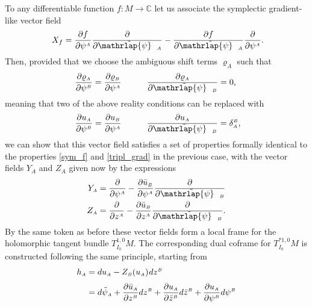 \documentclass[11pt]{amsart}
\theoremstyle{remark}
\theoremstyle{remark}
\theoremstyle{definition}
\theoremstyle{definition}
\theoremstyle{definition}
\newcommand{\0}{{\scriptstyle 0'}} %
\newcommand{\1}{{\scriptstyle 1'}}
\newcommand{\A}{{\scriptscriptstyle A}} %
\newcommand{\B}{{\scriptscriptstyle B}}
\newcommand{\C}{{\scriptscriptstyle C}}
\newcommand{\hp}{\hspace{0.5pt}} %
\newcommand{\psitilde}{\raisebox{0.3pt}{\smash{$\tilde{\smash{\mathrlap{\psi}} \vphantom{\rule[6.5pt]{0pt}{0pt}} \hphantom{\hspace{10.5pt}}}$}} \hspace{-4.1pt}}
\begin{document}
To any differentiable function $f : M \rightarrow \mathbb{C}$ let us associate the symplectic gradient-like vector field 
\begin{equation} \label{X_f_2}
X_f = \frac{\partial f}{\partial \psi^{\A}} \frac{\partial}{\partial \psitilde_{\A}} - \frac{\partial f}{\partial \psitilde_{\A}} \frac{\partial}{\partial \psi^{\A}} \rlap{.}
\end{equation}
Then, provided that we choose the ambiguous shift terms $\varrho_{\A}$ such that
\begin{equation} \label{shift-constr}
\!\!\! \frac{\partial \varrho_{\A}}{\partial \psi^{\B}} = \frac{\partial \varrho_{\B}}{\partial \psi^{\A}}
\qquad\quad
\frac{\partial \varrho_{\A}}{\partial \psitilde_{\B}} = 0  \rlap{,}
\end{equation}
meaning that two of the above reality conditions can be replaced with
\begin{equation}
\frac{\partial u_{\A}}{\partial \psi^{\B}} = \frac{\partial u_{\B}}{\partial \psi^{\A}} 
\qquad\quad
\frac{\partial u_{\A}}{\partial \psitilde_{\B}} = \delta^{\B}_{\A} \rlap{,}
\end{equation}
we can show that this vector field satisfies a set of properties formally identical to the properties \eqref{sym_f} and \eqref{tripl_grad} in the previous case, with the vector fields $Y_{\A}$ and $Z_{\A}$ given now by the expressions
\begin{equation} \label{YZ_2}
\begin{aligned}
Y_{\A} & = \frac{\partial }{\partial \psi^{\A}} - \frac{\partial \bar{u}_{\B}}{\partial \psi^{\A}} \frac{\partial}{\partial \psitilde_{\B}} \\
Z_{\A} & = \frac{\partial }{\partial z^{\A}} - \frac{\partial \bar{u}_{\B}}{\partial z^{\A}} \frac{\partial}{\partial \psitilde_{\B}}  \rlap{.}
\end{aligned}
\end{equation}
By the same token as before these vector fields form a local frame for  the holomorphic tangent bundle $T^{1,0}_{I_0}M$. The corresponding dual coframe for $T^{*1,0}_{I_0}M$ is constructed following the same principle, starting from
{\allowdisplaybreaks
\begin{align} \label{h_A_2}
h_{\A} & = du_{\A} - Z_{\B}(u_{\A}) \hp dz^{\B} \\[3pt]
& = d\tilde{\psi}_{\A} + \frac{\partial \bar{u}_{\A}}{\partial z^{\B}} dz^{\B} + \frac{\partial u_{\A}}{\partial \bar{z}^{\B}} d\bar{z}^{\B} + \frac{\partial u_{\A}}{\partial \psi^{\B}} d\psi^{\B} \nonumber %
\end{align}
}%
\end{document}
